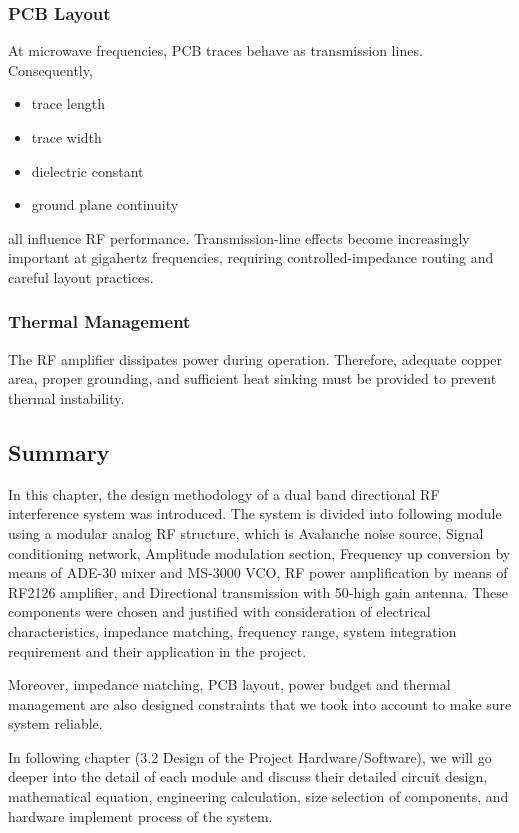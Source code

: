 \documentclass[12pt,a4paper]{report}
\begin{document}
	\subsubsection{PCB Layout}
	
	At microwave frequencies, PCB traces behave as transmission lines. Consequently,
	\begin{itemize}
		\item trace length
		\item trace width
		\item dielectric constant
		\item ground plane continuity
	\end{itemize}
	all influence RF performance. Transmission-line effects become increasingly important at gigahertz frequencies, requiring controlled-impedance routing and careful layout practices.
	
	\subsubsection{Thermal Management}
	
	The RF amplifier dissipates power during operation. Therefore, adequate copper area, proper grounding, and sufficient heat sinking must be provided to prevent thermal instability.
	
	\subsection{Summary}
	In this chapter, the design methodology of a dual band directional RF interference system was introduced. The system is divided into following module using a modular analog RF structure, which is Avalanche noise source, Signal conditioning network, Amplitude modulation section, Frequency up conversion by means of ADE-30 mixer and MS-3000 VCO, RF power amplification by means of RF2126 amplifier, and Directional transmission with 50-high gain antenna. These components were chosen and justified with consideration of electrical characteristics, impedance matching, frequency range, system integration requirement and their application in the project. 
	
	Moreover, impedance matching, PCB layout, power budget and thermal management are also designed constraints that we took into account to make sure system reliable. 
	
	In following chapter (3.2 Design of the Project Hardware/Software), we will go deeper into the detail of each module and discuss their detailed circuit design, mathematical equation, engineering calculation, size selection of components, and hardware implement process of the system.
	
\end{document}
